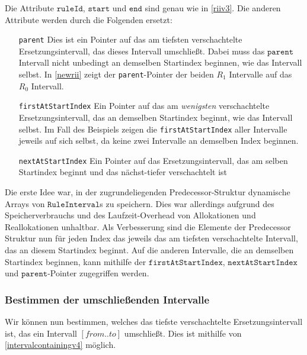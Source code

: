 Die Attribute $\texttt{ruleId}$, $\texttt{start}$ und $\texttt{end}$ sind genau wie in \autoref{riiv3}. Die anderen Attribute werden durch die Folgenden ersetzt:

\begin{itemize}[leftmargin=3cm]
    \item[\texttt{parent}] Dies ist ein Pointer auf das am tiefsten verschachtelte Ersetzungsintervall, das dieses Intervall umschließt. Dabei muss das $\texttt{parent}$ Intervall nicht unbedingt an demselben Startindex beginnen, wie das Intervall selbst. In \autoref{newrii} zeigt der \texttt{parent}-Pointer der beiden $R_1$ Intervalle auf das $R_0$ Intervall.
    \item[\texttt{firstAtStartIndex}] Ein Pointer auf das am \emph{wenigsten} verschachtelte Ersetzungsintervall, das an demselben Startindex beginnt, wie das Intervall selbst. Im Fall des Beispiels zeigen die \texttt{firstAtStartIndex} aller Intervalle jeweils auf sich selbst, da keine zwei Intervalle an demselben Index beginnen.
    \item[\texttt{nextAtStartIndex}] Ein Pointer auf das Ersetzungsintervall, das am selben Startindex beginnt und das nächst-tiefer verschachtelt ist
\end{itemize}

Die erste Idee war, in der zugrundeliegenden Predecessor-Struktur dynamische Arrays von $\texttt{RuleInterval}$s zu speichern. Dies war allerdings aufgrund des Speicherverbrauchs und des Laufzeit-Overhead von Allokationen und Reallokationen unhaltbar. Als Verbesserung sind die Elemente der Predecessor Struktur nun für jeden Index das jeweils das am tiefsten verschachtelte Intervall, das an diesem Startindex beginnt. Auf die anderen Intervalle, die an demselben Startindex beginnen, kann mithilfe der $\texttt{firstAtStartIndex}$, $\texttt{nextAtStartIndex}$ und $\texttt{parent}$-Pointer zugegriffen werden.

\subsubsection{Bestimmen der umschließenden Intervalle}

Wir können nun bestimmen, welches das tiefste verschachtelte Ersetzungsintervall ist, das ein Intervall $[from..to]$ umschließt.
Dies ist mithilfe von \autoref{intervalcontainingv4} möglich.

